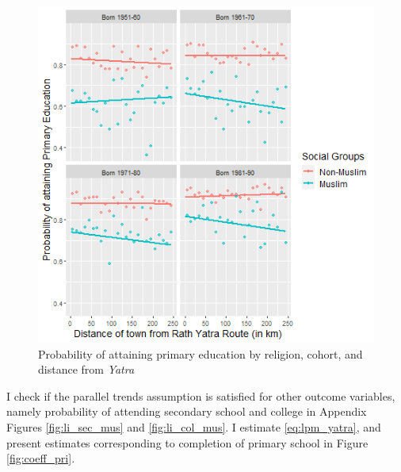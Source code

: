 \documentclass{article}
\begin{document}
\begin{figure}[H]
    \centering
    \includegraphics[scale = 0.7]{images/graph_li_pri_mus.png}
    \caption{Probability of attaining primary education by religion, cohort, and distance from \textit{Yatra}}
    \label{fig:li_pri_mus}
\end{figure}

I check if the parallel trends assumption is satisfied for other outcome variables, namely probability of attending secondary school and college in Appendix Figures \ref{fig:li_sec_mus} and \ref{fig:li_col_mus}. I estimate \ref{eq:lpm_yatra}, and present estimates corresponding to completion of primary school in Figure \ref{fig:coeff_pri}.
\end{document}
